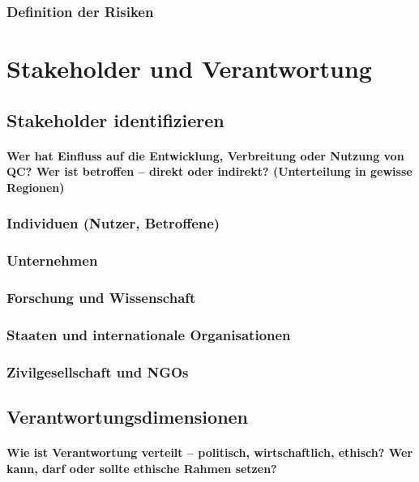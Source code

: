 \subsubsection{Definition der Risiken}



\section{Stakeholder und Verantwortung}

\subsection{Stakeholder identifizieren}
\paragraph{Wer hat Einfluss auf die Entwicklung, Verbreitung oder Nutzung von QC? 
Wer ist betroffen – direkt oder indirekt?
(Unterteilung in gewisse Regionen)}

\subsubsection{Individuen (Nutzer, Betroffene)}
\subsubsection{Unternehmen}
\subsubsection{Forschung und Wissenschaft}
\subsubsection{Staaten und internationale Organisationen}
\subsubsection{Zivilgesellschaft und NGOs}


\subsection{Verantwortungsdimensionen}
\paragraph{Wie ist Verantwortung verteilt – politisch, wirtschaftlich, ethisch? 
Wer kann, darf oder sollte ethische Rahmen setzen?}

